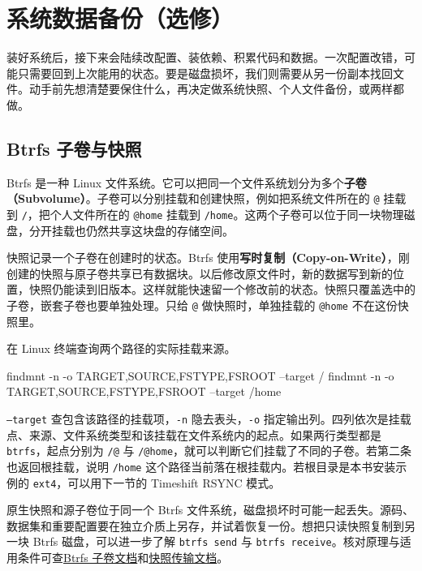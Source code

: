 \chapter{系统数据备份（选修）}
\label{app:backup}

装好系统后，接下来会陆续改配置、装依赖、积累代码和数据。一次配置改错，可能只需要回到上次能用的状态。要是磁盘损坏，我们则需要从另一份副本找回文件。动手前先想清楚要保住什么，再决定做系统快照、个人文件备份，或两样都做。

\section{Btrfs 子卷与快照}
\label{sec:backup-btrfs}

Btrfs 是一种 Linux 文件系统。它可以把同一个文件系统划分为多个\textbf{子卷（Subvolume）}。子卷可以分别挂载和创建快照，例如把系统文件所在的 \texttt{@} 挂载到 \texttt{/}，把个人文件所在的 \texttt{@home} 挂载到 \texttt{/home}。这两个子卷可以位于同一块物理磁盘，分开挂载也仍然共享这块盘的存储空间。

快照记录一个子卷在创建时的状态。Btrfs 使用\textbf{写时复制（Copy-on-Write）}，刚创建的快照与原子卷共享已有数据块。以后修改原文件时，新的数据写到新的位置，快照仍能读到旧版本。这样就能快速留一个修改前的状态。快照只覆盖选中的子卷，嵌套子卷也要单独处理。只给 \texttt{@} 做快照时，单独挂载的 \texttt{@home} 不在这份快照里。

\begin{example}[只读查看根目录与家目录所在的文件系统]
在 Linux 终端查询两个路径的实际挂载来源。
\begin{tbash}
findmnt -n -o TARGET,SOURCE,FSTYPE,FSROOT --target /
findmnt -n -o TARGET,SOURCE,FSTYPE,FSROOT --target /home
\end{tbash}
\texttt{--target} 查包含该路径的挂载项，\texttt{-n} 隐去表头，\texttt{-o} 指定输出列。四列依次是挂载点、来源、文件系统类型和该挂载在文件系统内的起点。如果两行类型都是 \texttt{btrfs}，起点分别为 \texttt{/@} 与 \texttt{/@home}，就可以判断它们挂载了不同的子卷。若第二条也返回根挂载，说明 \texttt{/home} 这个路径当前落在根挂载内。若根目录是本书安装示例的 \texttt{ext4}，可以用下一节的 Timeshift RSYNC 模式。
\end{example}

\begin{note}
原生快照和源子卷位于同一个 Btrfs 文件系统，磁盘损坏时可能一起丢失。源码、数据集和重要配置要在独立介质上另存，并试着恢复一份。想把只读快照复制到另一块 Btrfs 磁盘，可以进一步了解 \texttt{btrfs send} 与 \texttt{btrfs receive}。核对原理与适用条件可查\href{https://btrfs.readthedocs.io/en/latest/btrfs-subvolume.html}{Btrfs 子卷文档}和\href{https://btrfs.readthedocs.io/en/latest/btrfs-send.html}{快照传输文档}。
\end{note}

